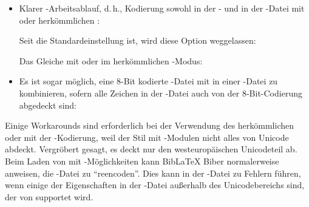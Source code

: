 \documentclass{ltxdockit}[2011/03/25]
\newcommand*{\biber}{Biber\xspace}
\newcommand*{\biblatex}{BibLaTeX\xspace}
\begin{document}
\begin{itemize}

\item Klarer -Arbeitsablauf, d.\,h.,  Kodierung sowohl in
der - und in der -Datei mit \pdftex oder herkömmlichen \tex:

\begin{ltxexample} 
\usepackage[utf8]{inputenc}
\usepackage[bibencoding=auto]{biblatex} 
\end{ltxexample}
%
Seit  die Standardeinstellung ist, wird diese Option
weggelassen:

\begin{ltxexample} 
\usepackage[utf8]{inputenc}
\usepackage{biblatex} 
\end{ltxexample}

Das Gleiche mit \xetex oder \luatex im herkömmlichen -Modus:

\begin{ltxexample} 
\usepackage{biblatex} 
\end{ltxexample}

\item Es ist sogar möglich, eine 8-Bit kodierte -Datei mit 
in einer -Datei zu kombinieren, sofern alle Zeichen in der
-Datei auch von der 8-Bit-Codierung abgedeckt sind:

\begin{ltxexample} 
\usepackage[latin1]{inputenc}
\usepackage[bibencoding=utf8]{biblatex} 
\end{ltxexample} 

\end{itemize}

Einige Workarounds sind erforderlich bei der Verwendung des herkömmlichen \tex
oder \pdftex mit der \utf-Kodierung, weil der Stil   mit
-Modulen nicht alles von Unicode abdeckt. Vergröbert gesagt, es deckt
nur den westeuropäischen Unicodeteil ab. Beim Laden von  mit
-Möglichkeiten kann \biblatex \biber normalerweise anweisen, die
-Datei zu "`reencoden"'. Dies kann in der -Datei zu
Fehlern führen, wenn einige der Eigenschaften in der -Datei außerhalb
des Unicodebereichs sind, der von  supportet wird.
\end{document}
